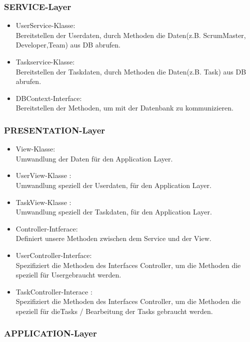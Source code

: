 \documentclass{article}
\begin{document}
\subsubsection{SERVICE-Layer}

\begin{itemize}
	\item UserService-Klasse: \\
	      Bereitstellen der Userdaten, durch Methoden die Daten(z.B. ScrumMaster, Developer,Team) aus DB abrufen.
	\item Taskservice-Klasse: \\
	      Bereitstellen der Taskdaten, durch Methoden die Daten(z.B. Task) aus DB abrufen.
	\item DBContext-Interface: \\
	      Bereitstellen der Methoden, um mit der Datenbank zu kommunizieren.
\end{itemize}

\subsubsection{PRESENTATION-Layer}

\begin{itemize}
	\item View-Klasse:\\
	      Umwandlung der Daten für den Application Layer.
	\item UserView-Klasse :\\
	      Umwandlung speziell der Userdaten, für den Application Layer.
	\item TaskView-Klasse :\\
	      Umwandlung speziell der Taskdaten, für den Application Layer.
	\item Controller-Intferace:\\
	      Definiert unsere Methoden zwischen dem Service und der View.
	\item UserController-Interface:\\
	      Spezifiziert die Methoden des Interfaces Controller, um die Methoden die speziell für Usergebraucht werden.
	\item TaskController-Interace :\\
	      Spezifiziert die Methoden des Interfaces Controller, um die Methoden die speziell für dieTasks / Bearbeitung der Tasks gebraucht werden.
\end{itemize}

\subsubsection{APPLICATION-Layer}
\end{document}
